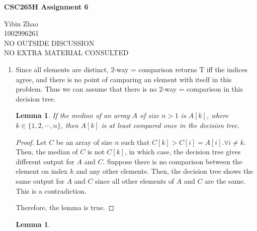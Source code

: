 \documentclass[10pt]{article}
\newtheorem{lemma}[theorem]{Lemma}
\begin{document}
\begin{center}
{\bf \Large \bf CSC265H Assignment 6}
\end{center}

\noindent
Yibin Zhao\\
1002996261\\
NO OUTSIDE DISCUSSION\\
NO EXTRA MATERIAL CONSULTED\\

\begin{comment}
The median of a set of numbers is the element with rank $\lfloor (n+1)/2 \rfloor$.
\end{comment}

\begin{enumerate}
	
	\begin{comment}
	Prove that any decesion tree using 2-way comparisons that finds the median of $n$ distinct numbers 
	also determines the set of numbers greater than the median and the set of numbers smaller than the median.
	\end{comment}

	\item
	Since all elements are distinct, 2-way = comparison returns T iff the indices agree, and there is no point of camparing an element with itself in this problem. 
	Thus we can assume that there is no 2-way = comparison in this decision tree.

	\begin{lemma}
	If the median of an array $A$ of size $n > 1$ is $A[k]$, where $k \in \{1, 2, \cdots, n\}$, then $A[k]$ is at least compared once in the decision tree.
	\end{lemma}

	\begin{proof}
	Let $C$ be an array of size $n$ such that $C[k] > C[i] = A[i]. \forall i \neq k$.
	Then, the median of $C$ is not $C[k]$, in which case, the decision tree gives different output for $A$ and $C$.
	Suppose there is no comparison between the element on index $k$ and any other elements.
	Then, the decision tree shows the same output for $A$ and $C$ since all other elements of $A$ and $C$ are the same.
	This is a contradiction.

	Therefore, the lemma is true.
	\end{proof}

	\begin{lemma}
	
	\end{lemma}
	


\end{enumerate}
\end{document}
